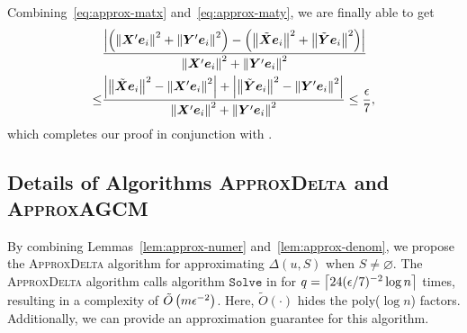 \documentclass[10pt,journal,compsoc,twocolumn,twoside]{IEEEtran}
\begin{document}
\begin{IEEEproof}
\begin{equation}
    \end{equation}
    Combining~\eqref{eq:approx-matx} and~\eqref{eq:approx-maty}, we are finally able to get
    \begin{align*}
            & \frac{\left|\left( \left\Vert\boldsymbol{X}'\boldsymbol{e}_i\right\Vert^2+\left\Vert\boldsymbol{Y}'\boldsymbol{e}_i\right\Vert^2 \right)-\left( \left\Vert\tilde{\boldsymbol{X}}\boldsymbol{e}_i\right\Vert^2+\left\Vert\tilde{\boldsymbol{Y}}\boldsymbol{e}_i\right\Vert^2 \right) \right|}{\left\Vert\boldsymbol{X}'\boldsymbol{e}_i\right\Vert^2+\left\Vert\boldsymbol{Y}'\boldsymbol{e}_i\right\Vert^2}             \\
        \le & \frac{\left|\left\Vert\tilde{\boldsymbol{X}}\boldsymbol{e}_i\right\Vert^2-\left\Vert\boldsymbol{X}'\boldsymbol{e}_i\right\Vert^2 \right|+\left|\left\Vert\tilde{\boldsymbol{Y}}\boldsymbol{e}_i\right\Vert^2-\left\Vert\boldsymbol{Y}'\boldsymbol{e}_i\right\Vert^2 \right|}{\left\Vert\boldsymbol{X}'\boldsymbol{e}_i\right\Vert^2+\left\Vert\boldsymbol{Y}'\boldsymbol{e}_i\right\Vert^2}\le\frac{\epsilon}{7},
    \end{align*}
    which completes our proof in conjunction with .
\end{IEEEproof}

\subsection{Details of Algorithms \textsc{ApproxDelta} and \textsc{ApproxAGCM}}

By combining Lemmas~\ref{lem:approx-numer} and~\ref{lem:approx-denom}, we propose the \textsc{ApproxDelta} algorithm for approximating \(\Delta(u,S)\) when \(S\neq\varnothing\).
The \textsc{ApproxDelta} algorithm calls algorithm \(\mathtt{Solve}\) in  for \(q=\left\lceil24(\epsilon/7)^{-2}\log n\right\rceil\) times, resulting in a complexity of \(\tilde{O}\left( m\epsilon^{-2} \right)\).
Here, \(\tilde{O}(\cdot)\) hides the poly(\(\log n\)) factors.
Additionally, we can provide an approximation guarantee for this algorithm.
\end{document}
